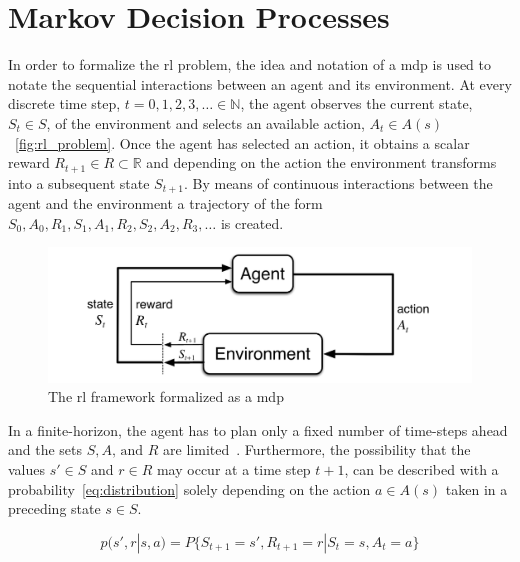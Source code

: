 \documentclass[draft,final]{vutinfth} %
\newcommand{\p}[1]{see p. #1}
\begin{document}
    \section{Markov Decision Processes}
    In order to formalize the \gls{rl} problem, the idea and notation of a \gls{mdp} is used to notate the sequential interactions between an agent and its environment.
    At every discrete time step, $t = 0,1,2,3, \ldots \in \mathbb{N}$, the agent observes the current state, $S_t \in \mathit{S}$, of the environment and selects an available action, $A_t \in \mathit{A}(s)$~\eqref{fig:rl_problem}.
    Once the agent has selected an action, it obtains a scalar reward $R_{t+1} \in \mathit{R} \subset \mathbb{R}$ and depending on the action the environment transforms into a subsequent state $S_{t+1}$.
    By means of continuous interactions between the agent and the environment a trajectory of the form $S_0,A_0,R_1,S_1,A_1,R_2,S_2,A_2,R_3,\ldots$ is created.

    \begin{figure}[h]
        \centering
        \includegraphics[width=\textwidth]{figures/rl_problem.png}
        \caption[The \gls{rl} framework formalized as a \gls{mdp}]{The \gls{rl} framework formalized as a \gls{mdp}\protect\footnotemark}
        \label{fig:rl_problem}
    \end{figure}

    \footnotetext{\cite[\p{48}]{sutton_reinforcement_2018}}

    In a finite-horizon, the agent has to plan only a fixed number of time-steps ahead and the sets $\mathit{S},\mathit{A}\text{, and }\mathit{R}$ are limited~\citep{kaelbling_reinforcement_1996,sutton_reinforcement_2018}.
    Furthermore, the possibility that the values $s'\in \mathit{S}$ and $r \in \mathit{R}$ may occur at a time step $t+1$, can be described with a probability~\eqref{eq:distribution} solely depending on the action $a \in \mathit{A}(s)$ taken in a preceding state $s \in \mathit{S}$.

    \begin{equation}
        p(s',r|s,a) = P\{S_{t+1}=s', R_{t+1}=r | S_t=s, A_t=a\}\label{eq:distribution}
    \end{equation}
\end{document}
